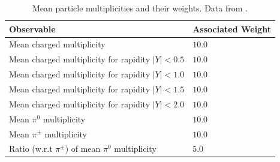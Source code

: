 \documentclass[aps,preprint,floatfix,nofootinbib,showpacs]{revtex4-1}
\begin{document}
 \begin{table}[tbp]
  \begin{center}
   \begin{tabular}{l|l}
    \hline 
    \hline
    Observable  \hspace{3cm}                             & \hspace{1cm} Associated Weight \\ \hline
    Mean charged multiplicity                            & \hspace{3cm} $10.0$ \\ \hline
    Mean charged multiplicity for rapidity $|Y| < 0.5$   & \hspace{3cm} $10.0$ \\ \hline
    Mean charged multiplicity for rapidity $|Y| < 1.0$   & \hspace{3cm} $10.0$ \\ \hline
    Mean charged multiplicity for rapidity $|Y| < 1.5$   & \hspace{3cm} $10.0$ \\ \hline
    Mean charged multiplicity for rapidity $|Y| < 2.0$   & \hspace{3cm} $10.0$ \\ \hline
    Mean $\pi^0$ multiplicity                            & \hspace{3cm} $10.0$ \\ \hline
    Mean $\pi^\pm$ multiplicity                          & \hspace{3cm} $10.0$ \\ \hline 
    Ratio (w.r.t $\pi^\pm$) of mean $\pi^0$ multiplicity & \hspace{3cm} $5.0$ \\ \hline
    \hline 
    \end{tabular}
  \end{center}
  \caption{Mean particle multiplicities and their weights. 
  Data from \cite{Barate:1996fi, Abreu:1996na, Ackerstaff:1998hz, Amsler:2008zzb}.}
  \label{Tab2}
 \end{table}
\end{document}
